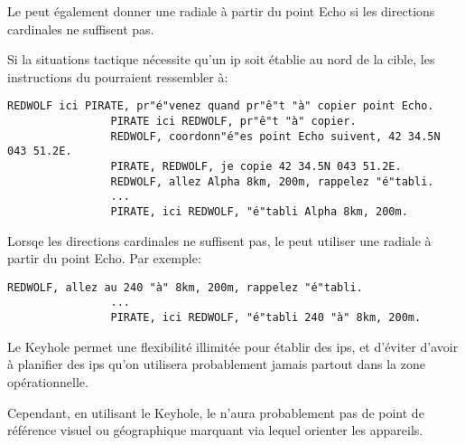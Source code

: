 \begin{e1}
\begin{e2}
\begin{e3}
			Le \ja{} peut également donner une radiale à partir du point Echo si les directions cardinales ne suffisent pas.
			
			
			\begin{e4}
				
				\begin{minipage}{\linewidth}
				\item Si la situations tactique nécessite qu'un \gls{ip} soit établie au nord de la cible, les instructions du \ja{} pourraient ressembler à:
				
				\begin{lstlisting}[caption=Keyhole: directions cardinale, label=keyholecard]
				REDWOLF ici PIRATE, pr"é"venez quand pr"ê"t "à" copier point Echo.
				PIRATE ici REDWOLF, pr"ê"t "à" copier.
				REDWOLF, coordonn"é"es point Echo suivent, 42 34.5N 043 51.2E.
				PIRATE, REDWOLF, je copie 42 34.5N 043 51.2E.
				REDWOLF, allez Alpha 8km, 200m, rappelez "é"tabli.
				...
				PIRATE, ici REDWOLF, "é"tabli Alpha 8km, 200m.
				\end{lstlisting}
				\end{minipage}
				
				\begin{minipage}{\linewidth}
				\item Lorsqe les directions cardinales ne suffisent pas, le \ja{} peut utiliser une radiale à partir du point Echo. Par exemple:
				
				\begin{lstlisting}[caption=Keyhole: radiale, label=keyholerad]
				REDWOLF, allez au 240 "à" 8km, 200m, rappelez "é"tabli.
				...
				PIRATE, ici REDWOLF, "é"tabli 240 "à" 8km, 200m.
				\end{lstlisting}
				\end{minipage}
				
			\end{e4}
			
			
			\item Le Keyhole permet une flexibilité illimitée pour établir des \glspl{ip}, et d'éviter d'avoir à planifier des \glspl{ip} qu'on utilisera probablement jamais partout dans la zone opérationnelle.
			
			Cependant, en utilisant le Keyhole, le \ja{} n'aura probablement pas de point de référence visuel ou géographique marquant via lequel orienter les appareils.
			

\end{e3}
\end{e2}
\end{e1}
